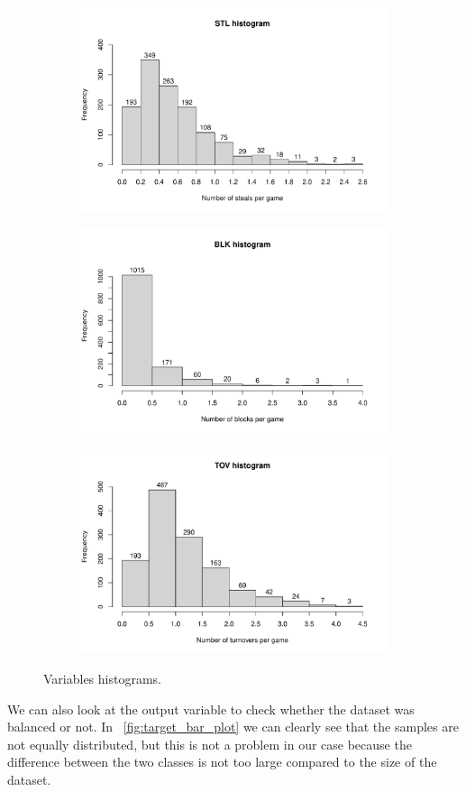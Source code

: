 \begin{figure}[h]
\begin{subfigure}{.33\textwidth}
		\label{fig:HistAST}
	\end{subfigure}%
	\begin{subfigure}{.33\textwidth}
		\centering
		\includegraphics[width=0.6\linewidth]{ImageFiles/Histograms/histogram_stl.pdf}
		\label{fig:HistSTL}
	\end{subfigure}%
	\begin{subfigure}{.33\textwidth}
		\centering
		\includegraphics[width=0.6\linewidth]{ImageFiles/Histograms/histogram_blk.pdf}
		\label{fig:HistBLK}
	\end{subfigure}
	\begin{subfigure}{.33\textwidth}
		\centering
		\includegraphics[width=0.6\linewidth]{ImageFiles/Histograms/histogram_tov.pdf}
		\label{fig:HistTOV}
	\end{subfigure}
	\caption{Variables histograms.}
	\label{fig:Histograms}
\end{figure}

We can also look at the output variable to check whether the dataset was balanced or not. In \Fig~\ref{fig:target_bar_plot} we can clearly see that the samples are not equally distributed, but this is not a problem in our case because the difference between the two classes is not too large compared to the size of the dataset.

